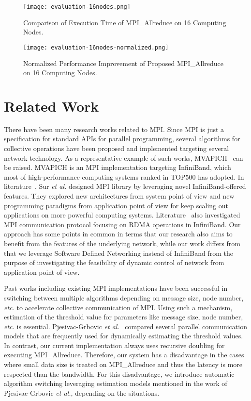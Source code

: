 \begin{figure}[htbp]
    \centering
    \texttt{[image: evaluation-16nodes.png]}
    \caption{Comparison of Execution Time of MPI\_Allreduce on 16 Computing Nodes.}%
    \label{fig-evaluation-16nodes}
\end{figure}

\begin{figure}[htbp]
    \centering
    \texttt{[image: evaluation-16nodes-normalized.png]}
    \caption{Normalized Performance Improvement of Proposed MPI\_Allreduce on 16 Computing Nodes.}%
    \label{fig-evaluation-16nodes-normalized}
\end{figure}

\section{Related Work}\label{iii-related-work}

There have been many research works related to MPI\@. Since MPI is just a
specification for standard APIs for parallel programming, several algorithms
for collective operations have been proposed and implemented targeting several
network technology. As a representative example of such works,
MVAPICH~\autocite{mvapich} can be raised. MVAPICH is an MPI implementation
targeting InfiniBand, which most of high-performance computing systems ranked
in TOP500 has adopted. In literature~\autocite{PjesivacGrbovic2011}, Sur \emph{et
al.} designed MPI library by leveraging novel InfiniBand-offered features.
They explored new architectures from system point of view and new programming
paradigms from application point of view for keep scaling out applications on
more powerful computing systems. Literature~\autocite{Jiuxing2004} also
investigated MPI communication protocol focusing on RDMA operations in
InfiniBand. Our approach has some points in common in terms that our research
also aims to benefit from the features of the underlying network, while our
work differs from that we leverage Software Defined Networking instead of
InfiniBand from the purpose of investigating the feasibility of dynamic
control of network from application point of view.

Past works including existing MPI implementations have been successful
in switching between multiple algorithms depending on message size, node
number, \emph{etc.} to accelerate collective communication of MPI\@. Using
such a mechanism, estimation of the threshold value for parameters like
message size, node number, \emph{etc.} is essential. Pjesivac-Grbovic \emph{et
al.}~\autocite{PjesivacGrbovic} compared several parallel communication models
that are frequently used for dynamically estimating the threshold values. In
contrast, our current implementation always uses recursive doubling for
executing MPI\_Allreduce. Therefore, our system has a disadvantage in the
cases where small data size is treated on MPI\_Allreduce and thus the latency
is more respected than the bandwidth. For this disadvantage, we introduce
automatic algorithm switching leveraging estimation models mentioned in the
work of Pjesivac-Grbovic \emph{et al.}, depending on the situations.

